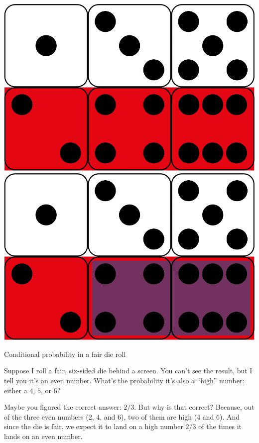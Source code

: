\documentclass[justified]{tufte-book}
\theoremstyle{definition}
\theoremstyle{definition}
\theoremstyle{definition}
\theoremstyle{remark}
\begin{document}
\begin{marginfigure}
\includegraphics{_main_files/figure-latex/unnamed-chunk-60-1} \includegraphics{_main_files/figure-latex/unnamed-chunk-60-2} \caption[Conditional probability in a fair die roll]{Conditional probability in a fair die roll}\label{fig:unnamed-chunk-60}
\end{marginfigure}

Suppose I roll a fair, six-sided die behind a screen. You can't see the
result, but I tell you it's an even number. What's the probability it's
also a ``high'' number: either a \(4\), \(5\), or \(6\)?

Maybe you figured the correct answer: \(2/3\). But why is that correct?
Because, out of the three even numbers (\(2\), \(4\), and \(6\)), two of
them are high (\(4\) and \(6\)). And since the die is fair, we expect it
to land on a high number \(2/3\) of the times it lands on an even
number.
\end{document}
